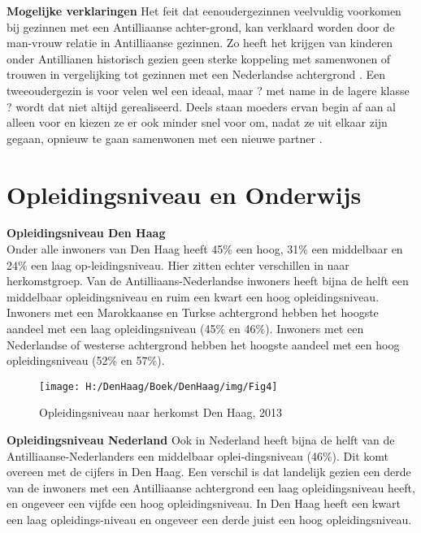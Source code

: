 \documentclass[]{book}
\begin{document}
\textbf{Mogelijke verklaringen} Het feit dat eenoudergezinnen veelvuldig
voorkomen bij gezinnen met een Antilliaanse achter-grond, kan verklaard
worden door de man-vrouw relatie in Antilliaanse gezinnen. Zo heeft het
krijgen van kinderen onder Antillianen historisch gezien geen sterke
koppeling met samenwonen of trouwen in vergelijking tot gezinnen met een
Nederlandse achtergrond \citep{Distelbrink2011}. Een tweeoudergezin is
voor velen wel een ideaal, maar ? met name in de lagere klasse ? wordt
dat niet altijd gerealiseerd. Deels staan moeders ervan begin af aan al
alleen voor en kiezen ze er ook minder snel voor om, nadat ze uit elkaar
zijn gegaan, opnieuw te gaan samenwonen met een nieuwe partner
\citep{Distelbrink2000}.

\hypertarget{opleidingsniveau-en-onderwijs}{%
\chapter*{Opleidingsniveau en
Onderwijs}\label{opleidingsniveau-en-onderwijs}}

\textbf{Opleidingsniveau Den Haag}\\
Onder alle inwoners van Den Haag heeft 45\% een hoog, 31\% een
middelbaar en 24\% een laag op-leidingsniveau. Hier zitten echter
verschillen in naar herkomstgroep. Van de Antilliaans-Nederlandse
inwoners heeft bijna de helft een middelbaar opleidingsniveau en ruim
een kwart een hoog opleidingsniveau. Inwoners met een Marokkaanse en
Turkse achtergrond hebben het hoogste aandeel met een laag
opleidingsniveau (45\% en 46\%). Inwoners met een Nederlandse of
westerse achtergrond hebben het hoogste aandeel met een hoog
opleidingsniveau (52\% en 57\%).

\begin{figure}
\texttt{[image: H:/DenHaag/Boek/DenHaag/img/Fig4]} \caption{Opleidingsniveau naar herkomst Den Haag, 2013}\label{fig:unnamed-chunk-4}
\end{figure}

\textbf{Opleidingsniveau Nederland} Ook in Nederland heeft bijna de
helft van de Antilliaanse-Nederlanders een middelbaar oplei-dingsniveau
(46\%). Dit komt overeen met de cijfers in Den Haag. Een verschil is dat
landelijk gezien een derde van de inwoners met een Antilliaanse
achtergrond een laag opleidingsniveau heeft, en ongeveer een vijfde een
hoog opleidingsniveau. In Den Haag heeft een kwart een laag
opleidings-niveau en ongeveer een derde juist een hoog opleidingsniveau.
\end{document}
